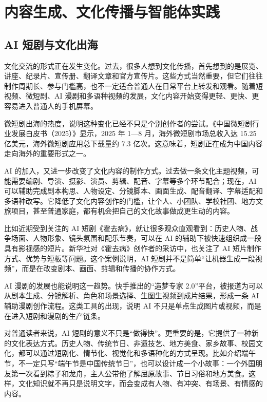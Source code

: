 
\section{内容生成、文化传播与智能体实践}

\subsection{AI 短剧与文化出海}

文化交流的形式正在发生变化。过去，很多人想到文化传播，首先想到的是展览、讲座、纪录片、宣传册、翻译文章和官方宣传片。这些方式当然重要，但它们往往制作周期长、参与门槛高，也不一定适合普通人在日常平台上转发和观看。随着短视频、微短剧、AI 漫剧和多语种视频的发展，文化内容开始变得更轻、更快、更容易进入普通人的手机屏幕。

微短剧出海的热度，说明这种变化已经不只是个别创作者的尝试。《中国微短剧行业发展白皮书（2025）》显示，2025 年 1—8 月，海外微短剧市场总收入达 15.25 亿美元，海外微短剧应用总下载量约 7.3 亿次。这意味着，短剧正在成为中国内容走向海外的重要形式之一。

AI 的加入，又进一步改变了文化内容的制作方式。过去做一条文化主题视频，可能需要编剧、导演、摄影、演员、剪辑、配音、字幕等多个环节配合；现在，AI 可以辅助完成剧本构思、人物设定、分镜脚本、画面生成、配音翻译、字幕适配和多语种改写。它降低了文化内容创作的门槛，让个人、小团队、学校社团、地方文旅项目，甚至普通家庭，都有机会把自己的文化故事做成更生动的内容。

比如近期受到关注的 AI 短剧《霍去病》，就让很多观众直观看到：历史人物、战争场面、人物形象、镜头氛围和配乐节奏，可以在 AI 的辅助下被快速组织成一段具有影视感的短片。新华社对《霍去病》创作者的采访中，也关注了 AI 短片制作方式、优势与短板等问题。这个案例说明，AI 短剧并不是简单“让机器生成一段视频”，而是在改变剧本、画面、剪辑和传播的协作方式。

AI 漫剧的发展也能说明这一趋势。快手推出的“造梦专家 2.0”平台，被报道为可以从剧本生成、分镜解析、角色和场景选择、生图生视频到成片结果，形成一条 AI 辅助漫剧创作流程。这类工具的出现，说明 AI 不只是单点生成图片或视频，而是在进入短剧和漫剧的生产链条。

对普通读者来说，AI 短剧的意义不只是“做得快”。更重要的是，它提供了一种新的文化表达方式。历史人物、传统节日、非遗技艺、地方美食、家乡故事、校园文化，都可以通过短剧化、情节化、视觉化和多语种化的方式呈现。比如介绍端午节，不一定只写“端午节是中国传统节日”，也可以设计成一个小故事：一个外国朋友第一次看到粽子和龙舟，主人公带他了解屈原故事、节日习俗和地方美食。这样，文化知识就不再只是说明文字，而会变成有人物、有冲突、有场景、有情感的内容。

